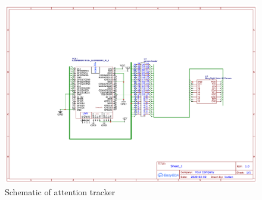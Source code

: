 \begin{figure}[!htbp]
\centering
\includegraphics[scale=0.15]{project}
\caption{Schematic of attention tracker}
\end{figure}

